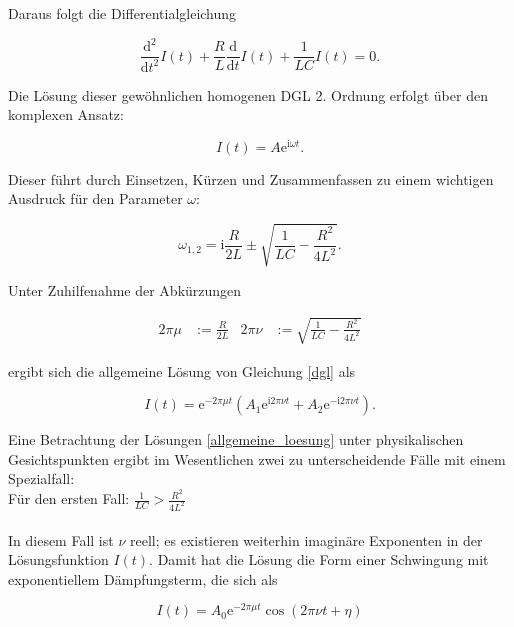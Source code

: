 \documentclass[
  bibliography=totoc,     %
  captions=tableheading,  %
  titlepage=firstiscover, %
]{scrartcl}
\begin{document}
Daraus folgt die Differentialgleichung

\begin{equation}
    \frac{\mathup{d}^2}{\mathup{d}t^2}I(t)+\frac{R}{L}\frac{\mathup{d}}{\mathup{d}t}I(t)+\frac{1}{LC}I(t)=0.
    \label{dgl}
\end{equation}

Die Lösung dieser gewöhnlichen homogenen DGL 2. Ordnung erfolgt über den
komplexen Ansatz:

\begin{equation}
    I(t)=A\mathup{e}^{\mathup{i}\omega t}.
    \label{ansatz}
\end{equation}

Dieser führt durch Einsetzen, Kürzen und Zusammenfassen zu einem wichtigen
Ausdruck für den Parameter $\omega$:

\begin{equation}
    \omega_{1,2}=\mathup{i}\frac{R}{2L}\pm\sqrt{\frac{1}{LC}-\frac{R^2}{4L^2}}.
    \label{omega}
\end{equation}

Unter Zuhilfenahme der Abkürzungen

\begin{align}
    2\pi\mu&:=\frac{R}{2L} & 2\pi\nu&:=\sqrt{\frac{1}{LC}-\frac{R^2}{4L^2}}
    \label{abkuerzungen}
\end{align}

ergibt sich die allgemeine Lösung von Gleichung \ref{dgl} als

\begin{equation}
    I(t)=\mathup{e}^{-2\pi\mu t}\left(A_1\mathup{e}^{\mathup{i}2\pi\nu t}+A_2\mathup{e}^{-\mathup{i}2\pi\nu t}\right).
    \label{allgemeine_loesung}
\end{equation}

Eine Betrachtung der Lösungen \ref{allgemeine_loesung} unter physikalischen
Gesichtspunkten ergibt im Wesentlichen zwei zu unterscheidende Fälle mit einem
Spezialfall:\\

Für den ersten Fall: $\frac{1}{LC}>\frac{R^2}{4L^2}$ \\
\\

In diesem Fall ist $\nu$ reell; es existieren weiterhin imaginäre Exponenten in
der Lösungsfunktion $I(t)$. Damit hat die Lösung die Form einer Schwingung mit
exponentiellem Dämpfungsterm, die sich als

\begin{equation}
    I(t)=A_0\mathup{e}^{-2\pi\mu t}\cos{\left(2\pi\nu t+\eta\right)}
    \label{schwingfall}
\end{equation}
\end{document}
